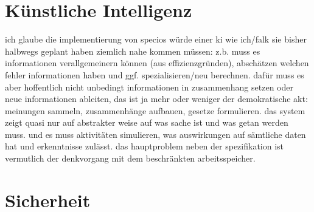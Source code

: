\section{Künstliche Intelligenz}

ich glaube die implementierung von specios würde einer ki wie ich/falk sie bisher halbwegs geplant haben ziemlich nahe kommen müssen:
z.b. muss es informationen verallgemeinern können (aus effizienzgründen), abschätzen welchen fehler informationen haben und ggf. spezialisieren/neu berechnen. dafür muss es aber hoffentlich nicht unbedingt informationen in zusammenhang setzen oder neue informationen ableiten, das ist ja mehr oder weniger der demokratische akt: meinungen sammeln, zusammenhänge aufbauen, gesetze formulieren. das system zeigt quasi nur auf abstrakter weise auf was sache ist und was getan werden muss.
und es muss aktivitäten simulieren, was auswirkungen auf sämtliche daten hat und erkenntnisse zulässt.
das hauptproblem neben der spezifikation ist vermutlich der denkvorgang mit dem beschränkten arbeitsspeicher.

\section{Sicherheit}
